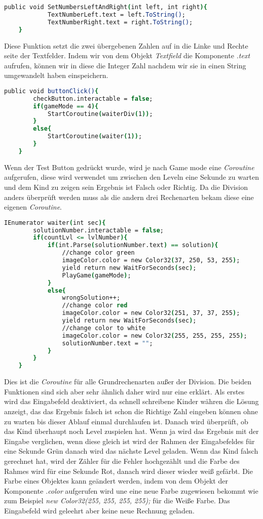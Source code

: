\begin{lstlisting}[language=csh, caption={MathOperations.cs SetTextLeftAndRight Funktion}]
	public void SetNumbersLeftAndRight(int left, int right){
			TextNumberLeft.text = left.ToString();
			TextNumberRight.text = right.ToString();
	}
\end{lstlisting}
Diese Funktion setzt die zwei übergebenen Zahlen auf in die Linke und Rechte seite der Textfelder. Indem wir von dem Objekt \textit{Textfield} die Komponente \textit{.text} aufrufen, können wir in diese die Integer Zahl nachdem wir sie in einen String umgewandelt haben einspeichern.\\
\begin{lstlisting}[language=csh, caption={MathOperations.cs ButtonClick Funktion}]
	public void buttonClick(){
		checkButton.interactable = false;
		if(gameMode == 4){
			StartCoroutine(waiterDiv(1));
		}
		else{
			StartCoroutine(waiter(1));
		}
	}
\end{lstlisting}
Wenn der Test Button gedrückt wurde, wird je nach Game mode eine \textit{Coroutine} aufgerufen, diese wird verwendet um zwischen den Leveln eine Sekunde zu warten und dem Kind zu zeigen sein Ergebnis ist Falsch oder Richtig. Da die Division anders überprüft werden muss als die andern drei Rechenarten bekam diese eine eigenen \textit{Coroutine}.\\
\begin{lstlisting}[language=csh, caption={MathOperations.cs waiter Funktion}]
	IEnumerator waiter(int sec){
		solutionNumber.interactable = false;
		if(countLvl <= lvlNumber){
			if(int.Parse(solutionNumber.text) == solution){
				//change color green
				imageColor.color = new Color32(37, 250, 53, 255);
				yield return new WaitForSeconds(sec);
				PlayGame(gameMode);
			}
			else{
				wrongSolution++;
				//change color red
				imageColor.color = new Color32(251, 37, 37, 255);
				yield return new WaitForSeconds(sec);
				//change color to white
				imageColor.color = new Color32(255, 255, 255, 255);
				solutionNumber.text = "";
			}
		}
	}
\end{lstlisting}
Dies ist die \textit{Coroutine} für alle Grundrechenarten außer der Division. Die beiden Funktionen sind sich aber sehr ähnlich daher wird nur eine erklärt. Als erstes wird das Eingabefeld deaktiviert, da schnell schreibene Kinder währen die Lösung anzeigt, das das Ergebnis falsch ist schon die Richtige Zahl eingeben können ohne zu warten bis dieser Ablauf einmal durchlaufen ist. Danach wird überprüft, ob das Kind überhaupt noch Level zuspielen hat. Wenn ja wird das Ergebnis mit der Eingabe verglichen, wenn diese gleich ist wird der Rahmen der Eingabefeldes für eine Sekunde Grün danach wird das nächste Level geladen. Wenn das Kind falsch gerechnet hat, wird der Zähler für die Fehler hochgezählt und die Farbe des Rahmes wird für eine Sekunde Rot, danach wird dieser wieder weiß gefärbt. Die Farbe eines Objektes kann geändert werden, indem von dem Objekt der Komponente \textit{.color} aufgerufen wird une eine neue Farbe zugewiesen bekommt wie zum Beispiel \textit{new Color32(255, 255, 255, 255);} für die Weiße Farbe. Das Eingabefeld wird geleehrt aber keine neue Rechnung geladen.\\
